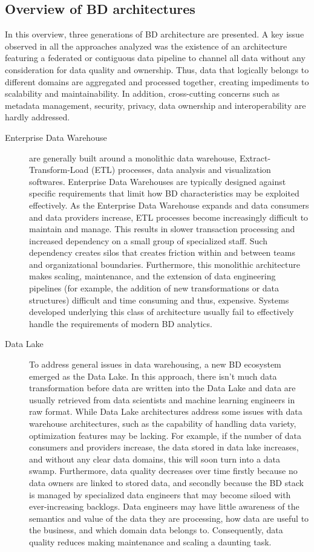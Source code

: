 \documentclass[a4paper,11pt]{article}
\begin{document}
\subsection{Overview of BD architectures} \label{BDArchitecture}
In this overview, three generations of BD architecture are presented. A key issue observed in all the approaches analyzed was the existence of an architecture featuring a federated or contiguous data pipeline to  channel all data without any consideration for data quality and ownership. Thus, data that logically belongs to different domains are aggregated and processed together, creating impediments to scalability and maintainability. In addition, cross-cutting concerns such as metadata management, security, privacy, data ownership and interoperability are hardly addressed.

\begin{description}
    \item[Enterprise Data Warehouse] are generally built around a monolithic data warehouse, Extract-Transform-Load (ETL) processes, data analysis and visualization softwares. Enterprise Data Warehouses are typically designed against specific requirements that limit how BD characteristics may be exploited effectively. As the Enterprise Data Warehouse expands and data consumers and data providers increase, ETL processes become increasingly difficult to maintain and manage. This results in slower transaction processing and increased dependency on a small group of specialized staff. Such dependency creates silos that creates friction within and between teams and organizational boundaries. Furthermore, this monolithic architecture makes scaling, maintenance, and the extension of data engineering pipelines (for example, the addition of new transformations or data structures)  difficult and time consuming and thus, expensive. Systems developed underlying this class of architecture usually fail to effectively handle the requirements of modern BD analytics.
    \item[Data Lake] To address general issues in data warehousing, a new BD ecosystem emerged as the Data Lake. In this approach, there isn't much data transformation before data are written into the Data Lake and data are usually retrieved from data scientists and machine learning engineers in raw format. While Data Lake architectures address some issues with data warehouse architectures, such as the capability of handling data variety, optimization features may be lacking. For example, if the number of data consumers and providers increase, the data stored in data lake increases, and without any clear data domains, this will soon turn into a data swamp. Furthermore, data quality decreases over time firstly because no data owners are linked to stored data, and secondly because the BD stack is managed by specialized data engineers that may become siloed with ever-increasing backlogs. Data engineers may have little awareness of the semantics and value of the data they are processing, how data are useful to the business, and which domain data belongs to. Consequently, data quality reduces making maintenance and scaling a daunting task. 

\end{description}
\end{document}
